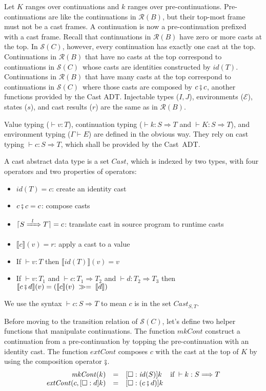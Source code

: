 \documentclass[runningheads]{llncs}
\newcommand{\sidecond}[1]{\text{if}\;#1}
\newcommand{\figequalto}[3]{#1 & = & #2 & #3 \\}
\newcommand{\RMachine}[1]{\ensuremath{\mathcal{R}(#1)}}
\newcommand{\RBMachine}[0]{\RMachine{B}}
\newcommand{\SMachine}[1]{\ensuremath{\mathcal{S}(#1)}}
\newcommand{\ecast}[2]{\ensuremath{#1 : #2}}
\newcommand{\ccast}[3]{#1 \xRightarrow[]{\enskip #2 \enskip} #3}
\newcommand{\Kcons}[2]{[#1]#2}
\newcommand{\Fcast}[1]{\ecast{\square}{#1}}
\newcommand{\mbind}[0]{\ensuremath{\;\gg=\;}}
\newcommand{\denote}[1]{\ensuremath{\llbracket #1 \rrbracket}}
\newcommand{\compose}[2]{\ensuremath{#1 \fatsemi #2}}
\newcommand{\translate}[1]{\ensuremath{\lceil#1\rceil}}
\newcommand{\id}[1]{\ensuremath{\mathit{id}(#1)}}
\newcommand{\mkCont}[1]{\ensuremath{\mathit{mkCont}(#1)}}
\newcommand{\extCont}[2]{\ensuremath{\mathit{extCont}(#1,#2)}}
\newcommand{\valuetyping}[2]{\ensuremath{\vdash #1 : #2}}
\newcommand{\envtyping}[2]{\ensuremath{#1 \vdash #2}}
\newcommand{\casttyping}[3]{\ensuremath{\vdash #1 : #2 \Longrightarrow #3}}
\begin{document}
Let $K$ ranges over continuations and $k$ ranges over pre-continuations.
%
Pre-continuations are like the continuations in \RMachine{B}, but their 
top-most frame must not be a cast frames.
%
A continuation is now a pre-continuation prefixed with a cast frame.
%
Recall that continuations in \RMachine{B} have zero or more casts at the top.
In \SMachine{C}, however, every continuation has exactly one cast at the 
top.
%
Continuations in \RMachine{B} that have no casts at the top correspond
to continuations in \SMachine{C}\ whose casts are identities constructed by 
$\id{T}$.
Continuations in \RMachine{B} that have many casts at the top 
correspond
to continuations in \SMachine{C}\ where those casts are composed by
$\compose{c}{c}$, another functions provided by the Cast ADT.
%
Injectable types ($I,J$), environments ($\mathcal{E}$), states ($s$), and cast 
results ($r$) are the same as in \RBMachine.

Value typing (\valuetyping{v}{T}), continuation typing 
(\casttyping{k}{S}{T} and \casttyping{K}{S}{T}), and environment typing 
(\envtyping{\Gamma}{E}) are defined in the obvious way. 
They rely on cast typing \casttyping{c}{S}{T}, which shall be provided by the 
Cast~ADT.

\begin{definition}
	\label{def:cast-rep}
	A cast abstract data type is a set $Cast$, which is indexed by two types, 
	with four operators and two properties of operators:
\begin{itemize}
	\item $id(T)=c$: create an identity cast
	\item $\compose{c}{c}=c$: compose casts
	\item $\translate{\ccast{S}{l}{T}}=c$: translate cast in source 
		program to runtime casts
	\item $\denote{c}(v)=r$: apply a cast to a value
	\item If $ \valuetyping{v}{T} $ then $\denote{\id{T}}(v)=v$
	\item If $ \valuetyping{v}{T_1} $ and
		$ \casttyping{c}{T_1}{T_2} $ and
		$ \casttyping{d}{T_2}{T_3} $ 
		then 
		$ \denote{\compose{c}{d}}(v) = (\denote{c}(v)\mbind\denote{d})$
\end{itemize}
We use the syntax \casttyping{c}{S}{T} to mean $c$ is in the set 
$\textit{Cast}_{S,T}$.
\end{definition}

Before moving to the transition relation of \SMachine{C}, let's define two 
helper functions that manipulate continuations.
%
The function $\mathit{mkCont}$ construct a continuation from a pre-continuation 
by topping the pre-continuation with an identity cast. 
%
The function $\mathit{extCont}$ composes $c$ with the cast at the top of $K$ by 
using the composition operator 
$\fatsemi$.
\[
\begin{array}{rclr}
\figequalto{\mkCont{k}}{\Kcons{\Fcast{\id{S}}}{k}}{\sidecond{\casttyping{k}{S}{T}}}
\figequalto{\extCont{c}{\Kcons{\Fcast{d}}{k}}}{
	\Kcons{\Fcast{(\compose{c}{d})}}{k}
}{}
\end{array}
\]
\end{document}
